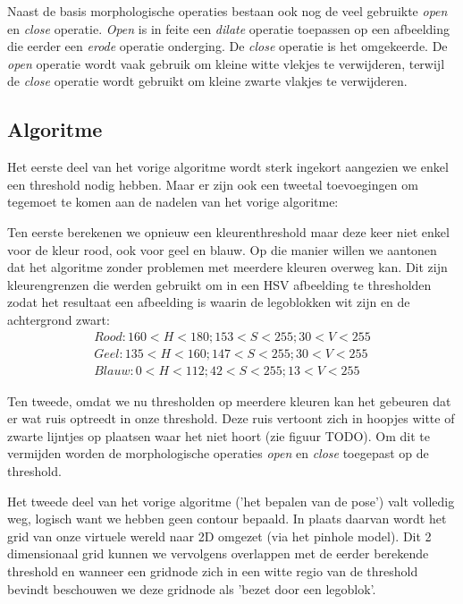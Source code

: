 Naast de basis morphologische operaties bestaan ook nog de veel gebruikte \textit{open} en \textit{close} operatie. \textit{Open} is in feite een \textit{dilate} operatie toepassen op een afbeelding die eerder een \textit{erode} operatie onderging. De \textit{close} operatie is het omgekeerde. De \textit{open} operatie wordt vaak gebruik om kleine witte vlekjes te verwijderen, terwijl de \textit{close} operatie wordt gebruikt om kleine zwarte vlakjes te verwijderen.

\subsection{Algoritme}
Het eerste deel van het vorige algoritme wordt sterk ingekort aangezien we enkel een threshold nodig hebben. Maar er zijn ook een tweetal toevoegingen om tegemoet te komen aan de nadelen van het vorige algoritme:

Ten eerste berekenen we opnieuw een kleurenthreshold maar deze keer niet enkel voor de kleur rood, ook voor geel en blauw. Op die manier  willen we aantonen dat het algoritme zonder problemen met meerdere kleuren overweg kan. Dit zijn kleurengrenzen die werden gebruikt om in een HSV afbeelding te thresholden zodat het resultaat een afbeelding is waarin de legoblokken wit zijn en de achtergrond zwart:
\begin{align*}
Rood: 160 < H < 180; 153 < S < 255; 30 < V < 255 \\
Geel: 135 < H < 160; 147 < S < 255; 30 < V < 255 \\
Blauw: 0 < H < 112; 42 < S < 255; 13 < V < 255
\end{align*}

Ten tweede, omdat we nu thresholden op meerdere kleuren kan het gebeuren dat er wat ruis optreedt in onze threshold. Deze ruis vertoont zich in hoopjes witte of zwarte lijntjes op plaatsen waar het niet hoort (zie figuur TODO). Om dit te vermijden worden de morphologische operaties \textit{open} en \textit{close} toegepast op de threshold.

Het tweede deel van het vorige algoritme ('het bepalen van de pose') valt volledig weg, logisch want we hebben geen contour bepaald. In plaats daarvan wordt het grid van onze virtuele wereld naar 2D omgezet (via het pinhole model). Dit 2 dimensionaal grid kunnen we vervolgens overlappen met de eerder berekende threshold en wanneer een gridnode zich in een witte regio van de threshold bevindt beschouwen we deze gridnode als 'bezet door een legoblok'.

